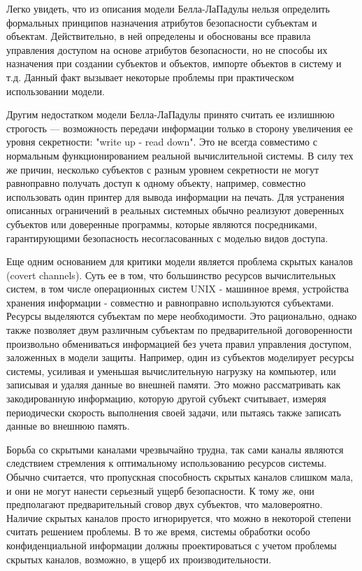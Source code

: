 Легко увидеть, что из описания модели Белла-ЛаПадулы нельзя определить формальных принципов назначения атрибутов безопасности субъектам и объектам. Действительно, в ней определены и обоснованы все правила управления доступом на основе атрибутов безопасности, но не способы их назначения при создании субъектов и объектов, импорте объектов в систему и т.д. Данный факт вызывает некоторые проблемы при практическом использовании модели.

Другим недостатком модели Белла-ЛаПадулы принято считать ее излишнюю строгость --- возможность передачи информации только в сторону увеличения ее уровня секретности: "write up - read down". Это не всегда совместимо с нормальным функционированием реальной вычислительной системы. В силу тех же причин, несколько субъектов с разным уровнем секретности не могут равноправно получать доступ к одному объекту, например, совместно использовать один принтер для вывода информации на печать. Для устранения описанных ограничений в реальных системных обычно реализуют доверенных субъектов или доверенные программы, которые являются посредниками, гарантирующими безопасность несогласованных с моделью видов доступа.

Еще одним основанием для критики модели является проблема скрытых каналов (covert channels). Суть ее в том, что большинство ресурсов вычислительных систем, в том числе операционных систем UNIX - машинное время, устройства хранения информации - совместно и равноправно используются субъектами. Ресурсы выделяются субъектам по мере необходимости. Это рационально, однако также позволяет двум различным субъектам по предварительной договоренности произвольно обмениваться информацией без учета правил управления доступом, заложенных в модели защиты. Например, один из субъектов моделирует ресурсы системы, усиливая и уменьшая вычислительную нагрузку на компьютер, или записывая и удаляя данные во внешней памяти. Это можно рассматривать как закодированную информацию, которую другой субъект считывает, измеряя периодически скорость выполнения своей задачи, или пытаясь также записать данные во внешнюю память.

Борьба со скрытыми каналами чрезвычайно трудна, так сами каналы являются следствием стремления к оптимальному использованию ресурсов системы. Обычно считается, что пропускная способность скрытых каналов слишком мала, и они не могут нанести серьезный ущерб безопасности. К тому же, они предполагают предварительный сговор двух субъектов, что маловероятно. Наличие скрытых каналов просто игнорируется, что можно в некоторой степени считать решением проблемы. В то же время, системы обработки особо конфиденциальной информации должны проектироваться с учетом проблемы скрытых каналов, возможно, в ущерб их производительности.

